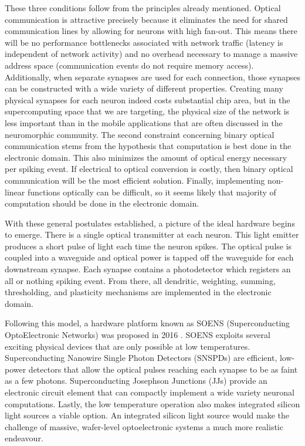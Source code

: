 \documentclass[twocolumn]{article}
\begin{document}
These three conditions follow from the principles already mentioned. Optical communication is attractive precisely because it eliminates the need for shared communication lines by allowing for neurons with high fan-out. This means there will be no performance bottlenecks associated with network traffic (latency is independent of network activity) and no overhead necessary to manage a massive address space (communication events do not require memory access). Additionally, when separate synapses are used for each connection, those synapses can be constructed with a wide variety of different properties. Creating many physical synapses for each neuron indeed costs substantial chip area, but in the supercomputing space that we are targeting, the physical size of the network is less important than in the mobile applications that are often discussed in the neuromorphic community. The second constraint concerning binary optical communication stems from the hypothesis that computation is best done in the electronic domain. This also minimizes the amount of optical energy necessary per spiking event. If electrical to optical conversion is costly, then binary optical communication will be the most efficient solution. Finally, implementing non-linear functions optically can be difficult, so it seems likely that majority of computation should be done in the electronic domain.

With these general postulates established, a picture of the ideal hardware begins to emerge. There is a single optical transmitter at each neuron. This light emitter produces a short pulse of light each time the neuron spikes. The optical pulse is coupled into a waveguide and optical power is tapped off the waveguide for each downstream synapse. Each synapse contains a photodetector which registers an all or nothing spiking event. From there, all dendritic, weighting, summing, thresholding, and plasticity mechanisms are implemented in the electronic domain. 

Following this model, a hardware platform known as SOENS (Superconducting OptoElectronic Networks) was proposed in 2016 \cite{shainline2017superconducting}. SOENS exploits several exciting physical devices that are only possible at low temperatures. Superconducting Nanowire Single Photon Detectors (SNSPDs) are efficient, low-power detectors that allow the optical pulses reaching each synapse to be as faint as a few photons. Superconducting Josephson Junctions (JJs) provide an electronic circuit element that can compactly implement a wide variety neuronal computations. Lastly, the low temperature operation also makes integrated silicon light sources a viable option. An integrated silicon light source would make the challenge of massive, wafer-level optoelectronic systems a much more realistic endeavour. 
\end{document}
